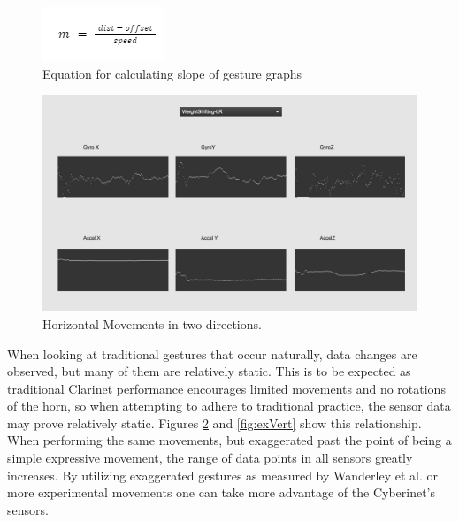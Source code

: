 \begin{figure}
    \centering
    \includegraphics{slopeEqu.png}
    \caption{Equation for calculating slope of gesture graphs}
    \label{fig:mequSlope}
\end{figure}


\begin{figure}
    \centering
    \includegraphics[scale=0.2]{diagrams/gestureData/weightshifting.png}
    \caption{Horizontal Movements in two directions.}
    \label{fig:exHor}
\end{figure}


 When looking at traditional gestures that occur naturally\cite{wanderleyClarinetGesture2005}, data changes are observed, but many of them are relatively static. This is to be expected as traditional Clarinet performance encourages limited movements and no rotations of the horn, so when attempting to adhere to traditional practice, the sensor data may prove relatively static. Figures \ref{fig:exHor} and \ref{fig:exVert} show this relationship. When performing the same movements, but exaggerated past the point of being a simple expressive movement, the range of data points in all sensors greatly increases. By utilizing exaggerated gestures as measured by Wanderley et al. or more experimental movements one can take more advantage of the Cyberinet's sensors.

